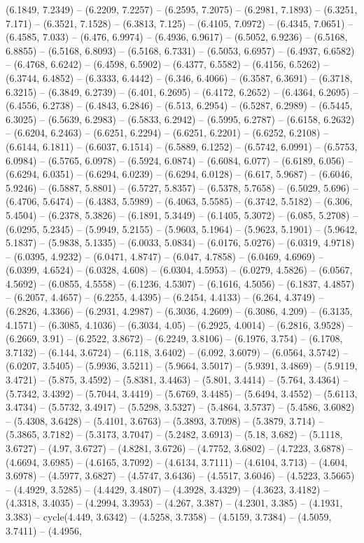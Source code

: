 (6.1849, 7.2349) -- (6.2209, 7.2257) -- (6.2595, 7.2075) -- (6.2981, 7.1893) -- (6.3251, 7.171) -- (6.3521, 7.1528) -- (6.3813, 7.125) -- (6.4105, 7.0972) -- (6.4345, 7.0651) -- (6.4585, 7.033) -- (6.476, 6.9974) -- (6.4936, 6.9617) -- (6.5052, 6.9236) -- (6.5168, 6.8855) -- (6.5168, 6.8093) -- (6.5168, 6.7331) -- (6.5053, 6.6957) -- (6.4937, 6.6582) -- (6.4768, 6.6242) -- (6.4598, 6.5902) -- (6.4377, 6.5582) -- (6.4156, 6.5262) -- (6.3744, 6.4852) -- (6.3333, 6.4442) -- (6.346, 6.4066) -- (6.3587, 6.3691) -- (6.3718, 6.3215) -- (6.3849, 6.2739) -- (6.401, 6.2695) -- (6.4172, 6.2652) -- (6.4364, 6.2695) -- (6.4556, 6.2738) -- (6.4843, 6.2846) -- (6.513, 6.2954) -- (6.5287, 6.2989) -- (6.5445, 6.3025) -- (6.5639, 6.2983) -- (6.5833, 6.2942) -- (6.5995, 6.2787) -- (6.6158, 6.2632) -- (6.6204, 6.2463) -- (6.6251, 6.2294) -- (6.6251, 6.2201) -- (6.6252, 6.2108) -- (6.6144, 6.1811) -- (6.6037, 6.1514) -- (6.5889, 6.1252) -- (6.5742, 6.0991) -- (6.5753, 6.0984) -- (6.5765, 6.0978) -- (6.5924, 6.0874) -- (6.6084, 6.077) -- (6.6189, 6.056) -- (6.6294, 6.0351) -- (6.6294, 6.0239) -- (6.6294, 6.0128) -- (6.617, 5.9687) -- (6.6046, 5.9246) -- (6.5887, 5.8801) -- (6.5727, 5.8357) -- (6.5378, 5.7658) -- (6.5029, 5.696) -- (6.4706, 5.6474) -- (6.4383, 5.5989) -- (6.4063, 5.5585) -- (6.3742, 5.5182) -- (6.306, 5.4504) -- (6.2378, 5.3826) -- (6.1891, 5.3449) -- (6.1405, 5.3072) -- (6.085, 5.2708) -- (6.0295, 5.2345) -- (5.9949, 5.2155) -- (5.9603, 5.1964) -- (5.9623, 5.1901) -- (5.9642, 5.1837) -- (5.9838, 5.1335) -- (6.0033, 5.0834) -- (6.0176, 5.0276) -- (6.0319, 4.9718) -- (6.0395, 4.9232) -- (6.0471, 4.8747) -- (6.047, 4.7858) -- (6.0469, 4.6969) -- (6.0399, 4.6524) -- (6.0328, 4.608) -- (6.0304, 4.5953) -- (6.0279, 4.5826) -- (6.0567, 4.5692) -- (6.0855, 4.5558) -- (6.1236, 4.5307) -- (6.1616, 4.5056) -- (6.1837, 4.4857) -- (6.2057, 4.4657) -- (6.2255, 4.4395) -- (6.2454, 4.4133) -- (6.264, 4.3749) -- (6.2826, 4.3366) -- (6.2931, 4.2987) -- (6.3036, 4.2609) -- (6.3086, 4.209) -- (6.3135, 4.1571) -- (6.3085, 4.1036) -- (6.3034, 4.05) -- (6.2925, 4.0014) -- (6.2816, 3.9528) -- (6.2669, 3.91) -- (6.2522, 3.8672) -- (6.2249, 3.8106) -- (6.1976, 3.754) -- (6.1708, 3.7132) -- (6.144, 3.6724) -- (6.118, 3.6402) -- (6.092, 3.6079) -- (6.0564, 3.5742) -- (6.0207, 3.5405) -- (5.9936, 3.5211) -- (5.9664, 3.5017) -- (5.9391, 3.4869) -- (5.9119, 3.4721) -- (5.875, 3.4592) -- (5.8381, 3.4463) -- (5.801, 3.4414) -- (5.764, 3.4364) -- (5.7342, 3.4392) -- (5.7044, 3.4419) -- (5.6769, 3.4485) -- (5.6494, 3.4552) -- (5.6113, 3.4734) -- (5.5732, 3.4917) -- (5.5298, 3.5327) -- (5.4864, 3.5737) -- (5.4586, 3.6082) -- (5.4308, 3.6428) -- (5.4101, 3.6763) -- (5.3893, 3.7098) -- (5.3879, 3.714) -- (5.3865, 3.7182) -- (5.3173, 3.7047) -- (5.2482, 3.6913) -- (5.18, 3.682) -- (5.1118, 3.6727) -- (4.97, 3.6727) -- (4.8281, 3.6726) -- (4.7752, 3.6802) -- (4.7223, 3.6878) -- (4.6694, 3.6985) -- (4.6165, 3.7092) -- (4.6134, 3.7111) -- (4.6104, 3.713) -- (4.604, 3.6978) -- (4.5977, 3.6827) -- (4.5747, 3.6436) -- (4.5517, 3.6046) -- (4.5223, 3.5665) -- (4.4929, 3.5285) -- (4.4429, 3.4807) -- (4.3928, 3.4329) -- (4.3623, 3.4182) -- (4.3318, 3.4035) -- (4.2994, 3.3953) -- (4.267, 3.387) -- (4.2301, 3.385) -- (4.1931, 3.383) -- cycle(4.449, 3.6342) -- (4.5258, 3.7358) -- (4.5159, 3.7384) -- (4.5059, 3.7411) -- (4.4956, 